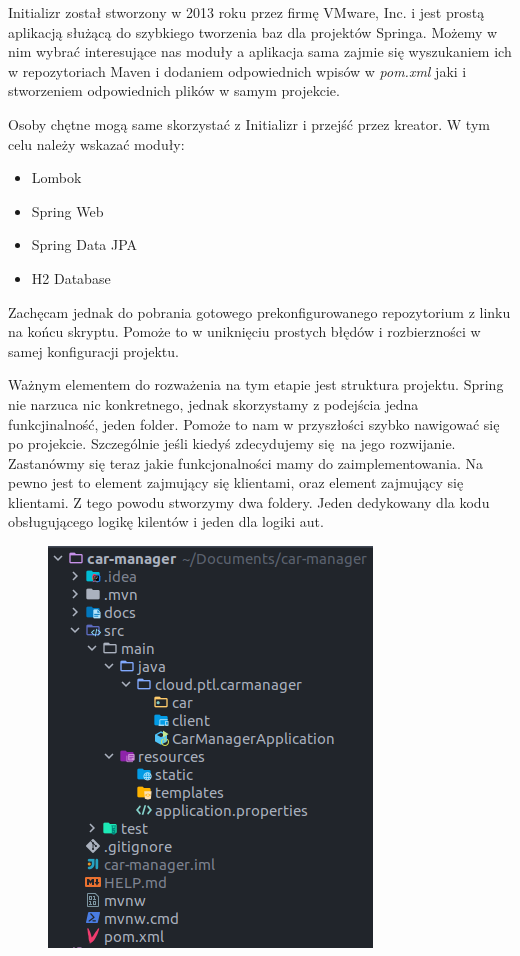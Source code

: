 \documentclass{article}
\begin{document}
        Initializr został stworzony w 2013 roku przez firmę VMware, Inc. i jest prostą aplikacją służącą do szybkiego tworzenia baz dla projektów Springa. Możemy w nim wybrać interesujące nas moduły a aplikacja sama zajmie się wyszukaniem ich w repozytoriach Maven i dodaniem odpowiednich wpisów w \emph{pom.xml} jaki i stworzeniem odpowiednich plików w samym projekcie. 
        
        Osoby chętne mogą same skorzystać z Initializr i przejść przez kreator. W tym celu należy wskazać moduły:
        \begin{itemize}
            \item Lombok
            \item Spring Web
            \item Spring Data JPA
            \item H2 Database
        \end{itemize}
        Zachęcam jednak do pobrania gotowego prekonfigurowanego repozytorium z linku na końcu skryptu. Pomoże to w uniknięciu prostych błędów i rozbierzności w samej konfiguracji projektu. 
        
        Ważnym elementem do rozważenia na tym etapie jest struktura projektu. Spring nie narzuca nic konkretnego, jednak skorzystamy z podejścia jedna funkcjinalność, jeden folder. Pomoże to nam w przyszłości szybko nawigować się po projekcie. Szczególnie jeśli kiedyś zdecydujemy się na jego rozwijanie. Zastanówmy się teraz jakie funkcjonalności mamy do zaimplementowania. Na pewno jest to element zajmujący się klientami, oraz element zajmujący się klientami. Z tego powodu stworzymy dwa foldery. Jeden dedykowany dla kodu obsługującego logikę kilentów i jeden dla logiki aut.
        
        \begin{figure}[h]
            \centering
            \includegraphics{tree.png}
        \end{figure}
    
\end{document}
